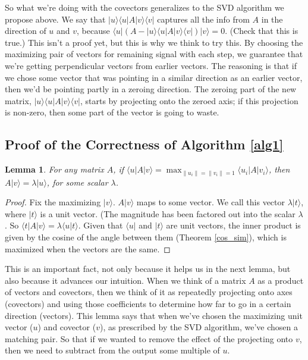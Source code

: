 \documentclass{amsbook}
\newtheorem{lemma}[theorem]{Lemma}
\begin{document}
\begin{tcolorbox}[title=Example: Covector Analogy,colback=blue!5]
So what we're doing with the covectors generalizes to the SVD algorithm we propose above.  We say that $| u \rangle\langle u |A| v \rangle\langle v |$ captures all the info from  $A$ in the direction of $ u $ and $ v $, because $\langle u |\left(A-| u \rangle\langle u |A| v \rangle\langle v |\right)| v \rangle=0$.  (Check that this is true.)  This isn't a proof yet, but this is why we think to try this.  By choosing the maximizing pair of vectors for remaining signal with each step, we guarantee that we're getting perpendicular vectors from earlier vectors.  The reasoning is that if we chose some vector that was pointing in a similar direction as an earlier vector, then we'd be pointing partly in a zeroing direction.  The zeroing part of the new matrix, $| u \rangle\langle u |A| v \rangle\langle v |$, starts by projecting onto the zeroed axis; if this projection is non-zero, then some part of the vector is going to waste.
\end{tcolorbox}

\subsection{Proof of the Correctness of Algorithm \ref{alg1}}

\begin{lemma}
\label{tollbooth}
For any matrix $A$, if $\langle u |A| v \rangle=\max_{\|u_i\|=\|v_i\|=1}\langle u_i |A| v_i \rangle$, then $A| v \rangle=\lambda| u \rangle$, for some scalar $\lambda$.
\end{lemma}

\begin{proof}
Fix the maximizing $|v\rangle$.  $A| v \rangle$ maps to some vector.  We call this vector $\lambda|t\rangle$, where $|t\rangle$ is a unit vector.  (The magnitude has been factored out into the scalar $\lambda$.  So $\langle t |A| v \rangle=\lambda\langle u | t\rangle$.  Given that $\langle u |$ and $| t\rangle$ are unit vectors, the inner product is given by the cosine of the angle between them (Theorem \ref{cos_sim}), which is maximized when the vectors are the same.
\end{proof}

This is an important fact, not only because it helps us in the next lemma, but also because it advances our intuition.  When we think of a matrix $A$ as a product of vectors and covectors, then we think of it as repeatedly projecting onto axes (covectors) and using those coefficients to determine how far to go in a certain direction (vectors).  This lemma says that when we've chosen the maximizing unit vector ($ u $) and covector ($ v $), as prescribed by the SVD algorithm, we've chosen a matching pair.  So that if we wanted to remove the effect of the projecting onto $ v $, then we need to subtract from the output some multiple of $ u $.
\end{document}
